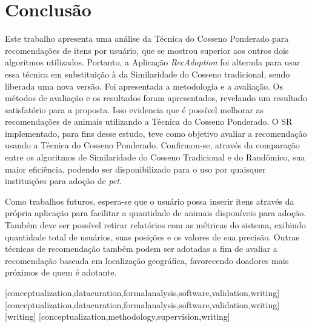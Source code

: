 \documentclass[portuguese]{textolivre}
\begin{document}
\section{Conclusão}
\label{cap:conclusion}

Este trabalho apresenta uma análise da Técnica do Cosseno Ponderado para recomendações de itens por usuário, que se mostrou superior aos outros dois algoritmos utilizados. Portanto, a Aplicação \textit{RecAdoption} foi alterada para usar essa técnica em substituição à da Similaridade do Cosseno tradicional, sendo liberada uma nova versão. Foi apresentada a metodologia e a avaliação. Os métodos de avaliação e os resultados foram apresentados, revelando um resultado satisfatório para a proposta. Isso evidencia que é possível melhorar as recomendações de animais utilizando a Técnica do Cosseno Ponderado. O SR implementado, para fins desse estudo, teve como objetivo avaliar a recomendação usando a Técnica do Cosseno Ponderado. Confirmou-se, através da comparação entre os algoritmos de Similaridade do Cosseno Tradicional e do Randômico, sua maior eficiência, podendo ser disponibilizado para o uso por quaisquer instituições para adoção de \textit{pet}.

Como trabalhos futuros, espera-se que o usuário possa inserir itens através da própria aplicação para facilitar a quantidade de animais disponíveis para adoção. Também deve ser possível retirar relatórios com as métricas do sistema, exibindo quantidade total de usuários, suas posições e os valores de sua precisão. Outras técnicas de recomendação também podem ser adotadas a fim de avaliar a recomendação baseada em localização geográfica, favorecendo doadores mais próximos de quem é adotante.


\printbibliography

\begin{contributors}
[conceptualization,datacuration,formalanalysis,software,validation,writing]
[conceptualization,datacuration,formalanalysis,software,validation,writing]
[writing]
[conceptualization,methodology,supervision,writing]
\end{contributors}
\end{document}
